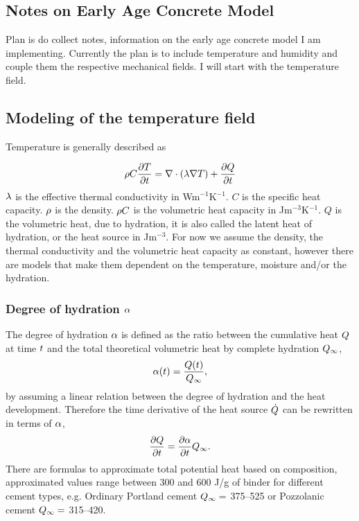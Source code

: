 
\subsection{Notes on Early Age Concrete Model}
Plan is do collect notes, information on the early age concrete model I am implementing.
Currently the plan is to include temperature and humidity and couple them the respective mechanical fields.
I will start with the temperature field.

\subsection{Modeling of the temperature field}
Temperature is generally described as

\begin{align}
	\rho C \frac{\partial T}{\partial t} = \nabla \cdot (\lambda \nabla T) + \frac{\partial Q}{\partial t} \label{eq:heat1}
\end{align}
$\lambda$ is the effective thermal conductivity in Wm$^{-1}$K$^{-1}$.
$C$ is the specific heat capacity.
$\rho$ is the density.
$\rho C$ is the volumetric heat capacity in Jm$^{-3}$K$^{-1}$.
$Q$ is the volumetric heat, due to hydration, it is also called the latent heat of hydration, or the heat source in Jm$^{-3}$.
For now we assume the density, the thermal conductivity and the volumetric heat capacity as constant, however there are models that make them dependent on the temperature, moisture and/or the hydration.


\subsubsection{Degree of hydration\texorpdfstring{ $\alpha$}{}}
The degree of hydration $\alpha$ is defined as the ratio between the cumulative heat $Q$ at time $t$ and the total theoretical volumetric heat by complete hydration $Q_{\infty}$,
\begin{align}
	\alpha(t) = \frac{Q(t)}{Q_{\infty}},
\end{align}
by assuming a linear relation between the degree of hydration and the heat development.
Therefore the time derivative of the heat source $\dot{Q}$ can be rewritten in terms of $\alpha$, 
\begin{align}
	\frac{\partial Q}{\partial t} = \frac{\partial \alpha}{\partial t} Q_{\infty}. \label{eq:qdotalphadot}
\end{align}
There are formulas to approximate total potential heat based on composition, approximated values range between 300 and 600 J/g of binder for different cement types, e.g. Ordinary Portland cement $Q_{\infty} =$ 375–525 or Pozzolanic cement $Q_{\infty} =$ 315–420.  

